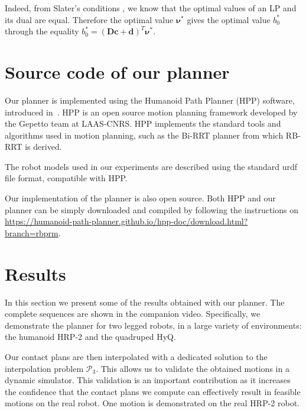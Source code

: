 \documentclass[journal]{IEEEtran}
\providecommand{\DIFaddtex}[1]{#1} %
\providecommand{\DIFdeltex}[1]{} %
\providecommand{\DIFaddbegin}{\protect\color{blue}} %
\providecommand{\DIFaddend}{\protect\color{black}} %
\providecommand{\DIFdelbegin}{\protect\cbdelete} %
\providecommand{\DIFdelend}{} %
\providecommand{\DIFadd}[1]{\texorpdfstring{\DIFaddtex{#1}}{#1}} %
\providecommand{\DIFdel}[1]{\texorpdfstring{\DIFdeltex{#1}}{}} %
\begin{document}
\DIFadd{Indeed, from Slater's conditions \citep{Boyd:2004:CO:993483}, we know that the optimal values of an LP and its dual are equal.
Therefore the optimal value $\bm{\nu}^*$ gives the optimal value $b_0^*$ through the equality $b_0^* = (\mathbf{D} \mathbf{c} + \mathbf{d})^T \bm{\nu}^*$.
}

\section{\DIFadd{Source code of our planner}}
\label{app:hpp}
\DIFadd{Our planner is implemented using the Humanoid Path Planner (HPP) software, introduced in~\cite{7759083}.
HPP is an open source motion planning framework developed by the Gepetto team at LAAS-CNRS.
HPP implements the standard tools and algorithms used in motion planning,
such as the Bi-RRT planner from which RB-RRT is derived.
}

\DIFadd{The robot models used in our experiments are described using the standard urdf file format, compatible with HPP.
}

\DIFadd{Our implementation of the planner is also open source.
Both HPP and our planner can be simply downloaded and compiled by following the instructions on
}\url{https://humanoid-path-planner.github.io/hpp-doc/download.html?branch=rbprm}\DIFadd{. 
}\DIFaddend \section{Results}
\label{sec:results}
In this section we present some of the results obtained with our planner. The complete sequences are shown in the companion video.
Specifically, we demonstrate the planner for two legged robots, in a large variety of environments: the humanoid HRP-2 and the quadruped HyQ.
\DIFdelbegin \DIFdel{Finally, a last example suggests possible applications to dexterous manipulation.
}\DIFdelend %

\DIFdelbegin \DIFdel{At the end of the video, we validate our contact plans by exhibiting a }\DIFdelend \DIFaddbegin \DIFadd{Our contact plans are then interpolated with a dedicated }\DIFaddend solution to the interpolation problem $\mathcal{P}_3$. \DIFaddbegin \DIFadd{This allows us to validate the obtained
motions in a dynamic simulator. This validation is an important contribution as it increases the confidence that the contact plans we compute can effectively
result in feasible motions on the real robot. One motion is demonstrated on the real HRP-2 robot.
}\DIFaddend 
\end{document}

